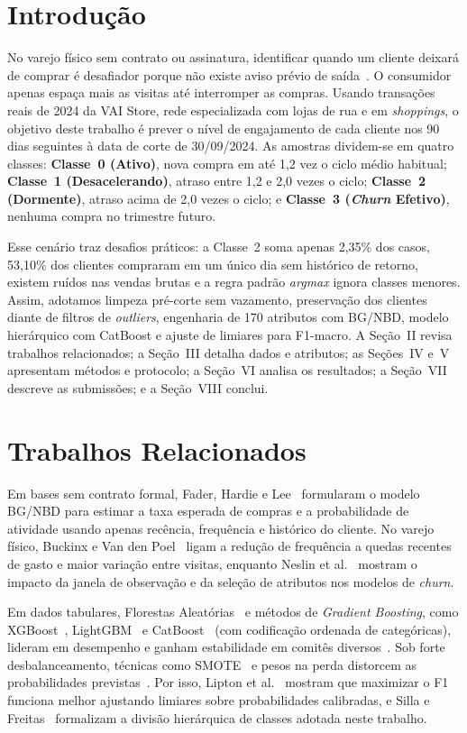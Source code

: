 \documentclass[10pt, conference, compsocconf]{IEEEtran}
\begin{document}
\section{Introdução}
No varejo físico sem contrato ou assinatura, identificar quando um cliente deixará de comprar é desafiador porque não existe aviso prévio de saída~\cite{buckinx2005retail}. O consumidor apenas espaça mais as visitas até interromper as compras. Usando transações reais de 2024 da VAI Store, rede especializada com lojas de rua e em \textit{shoppings}, o objetivo deste trabalho é prever o nível de engajamento de cada cliente nos 90 dias seguintes à data de corte de 30/09/2024. As amostras dividem-se em quatro classes: \textbf{Classe~0 (Ativo)}, nova compra em até 1,2 vez o ciclo médio habitual; \textbf{Classe~1 (Desacelerando)}, atraso entre 1,2 e 2,0 vezes o ciclo; \textbf{Classe~2 (Dormente)}, atraso acima de 2,0 vezes o ciclo; e \textbf{Classe~3 (\textit{Churn} Efetivo)}, nenhuma compra no trimestre futuro.

Esse cenário traz desafios práticos: a Classe~2 soma apenas 2,35\% dos casos, 53,10\% dos clientes compraram em um único dia sem histórico de retorno, existem ruídos nas vendas brutas e a regra padrão \textit{argmax} ignora classes menores. Assim, adotamos limpeza pré-corte sem vazamento, preservação dos clientes diante de filtros de \textit{outliers}, engenharia de 170 atributos com BG/NBD, modelo hierárquico com CatBoost e ajuste de limiares para F1-macro. A Seção~II revisa trabalhos relacionados; a Seção~III detalha dados e atributos; as Seções~IV e~V apresentam métodos e protocolo; a Seção~VI analisa os resultados; a Seção~VII descreve as submissões; e a Seção~VIII conclui.

\section{Trabalhos Relacionados}
Em bases sem contrato formal, Fader, Hardie e Lee~\cite{fader2005bgnbd} formularam o modelo BG/NBD para estimar a taxa esperada de compras e a probabilidade de atividade usando apenas recência, frequência e histórico do cliente. No varejo físico, Buckinx e Van den Poel~\cite{buckinx2005retail} ligam a redução de frequência a quedas recentes de gasto e maior variação entre visitas, enquanto Neslin et al.~\cite{neslin2006churn} mostram o impacto da janela de observação e da seleção de atributos nos modelos de \textit{churn}.

Em dados tabulares, Florestas Aleatórias~\cite{breiman2001rf} e métodos de \textit{Gradient Boosting}, como XGBoost~\cite{chen2016xgboost}, LightGBM~\cite{ke2017lightgbm} e CatBoost~\cite{prokhorenkova2018catboost} (com codificação ordenada de categóricas), lideram em desempenho e ganham estabilidade em comitês diversos~\cite{caruana2004ensemble,hastie2009esl}. Sob forte desbalanceamento, técnicas como SMOTE~\cite{chawla2002smote} e pesos na perda distorcem as probabilidades previstas~\cite{guo2017calibration}. Por isso, Lipton et al.~\cite{lipton2014f1} mostram que maximizar o F1 funciona melhor ajustando limiares sobre probabilidades calibradas, e Silla e Freitas~\cite{silla2011hierarchical} formalizam a divisão hierárquica de classes adotada neste trabalho.
\end{document}
